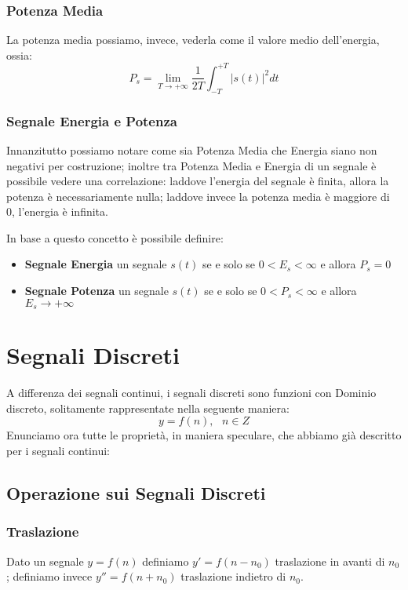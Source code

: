 \subsubsection{Potenza Media}
La potenza media possiamo, invece, vederla come il valore medio dell'energia, ossia:
\begin{equation}
    P_s = \lim_{T \rightarrow +\infty} \frac{1}{2T} \int_{-T}^{+T}|s(t)|^2 dt
\end{equation}

\subsubsection{Segnale Energia e Potenza} \label{def: sep}
Innanzitutto possiamo notare come sia Potenza Media che Energia siano non negativi per costruzione;
inoltre tra Potenza Media e Energia di un segnale è possibile vedere una correlazione: laddove l'energia del segnale è finita, allora la potenza è necessariamente nulla;
laddove invece la potenza media è maggiore di 0, l'energia è infinita.

In base a questo concetto è possibile definire:
\begin{itemize}
    \item \textbf{Segnale Energia} un segnale $s(t)$ se e solo se $0 < E_s < \infty$ e allora $P_s = 0$
    \item \textbf{Segnale Potenza} un segnale $s(t)$ se e solo se $0 < P_s < \infty$ e allora $E_s \rightarrow +\infty$
\end{itemize}

\newpage

\section{Segnali Discreti}
A differenza dei segnali continui, i segnali discreti sono funzioni con Dominio discreto, solitamente rappresentate nella seguente maniera:
\begin{equation*}
    y = f(n), \mbox{  } n \in Z
\end{equation*}
Enunciamo ora tutte le proprietà, in maniera speculare, che abbiamo già descritto per i segnali continui:
\subsection{Operazione sui Segnali Discreti}
\subsubsection{Traslazione}
Dato un segnale $y = f(n)$ definiamo $y' = f(n - n_0)$ traslazione in avanti di $n_0$; definiamo invece $y'' = f(n + n_0)$ traslazione indietro di $n_0$.

